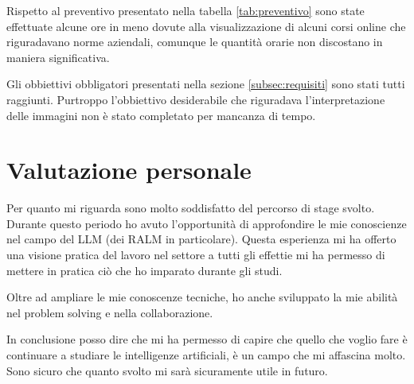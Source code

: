 Rispetto al preventivo presentato nella tabella \ref{tab:preventivo} sono state effettuate alcune ore in meno dovute alla visualizzazione di alcuni corsi online che riguradavano norme aziendali, comunque le quantità orarie non discostano in maniera significativa. 

Gli obbiettivi obbligatori presentati nella sezione \ref{subsec:requisiti} sono stati tutti raggiunti.
Purtroppo l'obbiettivo desiderabile che riguradava l'interpretazione delle immagini non è stato completato per mancanza di tempo.

\section{Valutazione personale}
Per quanto mi riguarda sono molto soddisfatto del percorso di stage svolto.
Durante questo periodo ho avuto l'opportunità di approfondire le mie conoscienze nel campo del LLM (dei RALM in particolare).
Questa esperienza mi ha offerto una visione pratica del lavoro nel settore a tutti gli effettie mi ha permesso di mettere in pratica ciò che ho imparato durante gli studi.


Oltre ad ampliare le mie conoscenze tecniche, ho anche sviluppato la mie abilità nel problem solving e nella collaborazione.

In conclusione posso dire che mi ha permesso di capire che quello che voglio fare è continuare a studiare le intelligenze artificiali, è un campo che mi affascina molto.
Sono sicuro che quanto svolto mi sarà sicuramente utile in futuro.
